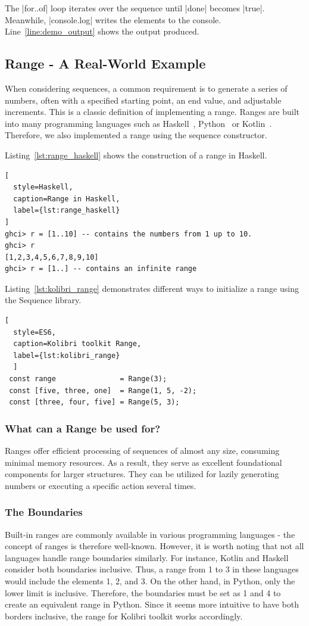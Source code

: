 The |for..of| loop iterates over the sequence until |done| becomes |true|.
Meanwhile, |console.log| writes the elements to the console.
Line~\ref{line:demo_output} shows the output produced.


\subsection{Range - A Real-World Example}
\label{sub:Range - A Real-World Example}
When considering sequences, a common requirement is to generate a series of
numbers, often with a specified starting point, an end value, and adjustable
increments. This is a classic definition of implementing a range.
Ranges are built into many programming languages such as
Haskell~\cite{haskell_list}, Python~\cite{python_range} or
Kotlin~\cite{kotlin_ranges}. Therefore, we also implemented a range using the
sequence constructor. 

Listing~\ref{lst:range_haskell} shows the construction of a range in Haskell.
\begin{lstlisting}[
  style=Haskell,
  caption=Range in Haskell,
  label={lst:range_haskell}
]
ghci> r = [1..10] -- contains the numbers from 1 up to 10.
ghci> r
[1,2,3,4,5,6,7,8,9,10]
ghci> r = [1..] -- contains an infinite range
\end{lstlisting}

Listing~\ref{lst:kolibri_range} demonstrates different ways to initialize a
range using the Sequence library.

\begin{lstlisting}[
  style=ES6, 
  caption=Kolibri toolkit Range,
  label={lst:kolibri_range}
  ]
 const range               = Range(3);
 const [five, three, one]  = Range(1, 5, -2);
 const [three, four, five] = Range(5, 3);
\end{lstlisting}

\subsubsection{What can a Range be used for?}
\label{subsub:What can a Range be used for?}
Ranges offer efficient processing of sequences of almost any size, consuming
minimal memory resources. As a result, they serve as excellent foundational
components for larger structures. They can be utilized for lazily generating
numbers or executing a specific action several times.

\subsubsection{The Boundaries}
\label{subsub:The Boundaries}
Built-in ranges are commonly available in various programming languages - the
concept of ranges is therefore well-known. However, it is worth noting that not
all languages handle range boundaries similarly. For instance, Kotlin and
Haskell consider both boundaries inclusive. Thus, a range from 1 to 3 in these
languages would include the elements 1, 2, and 3. On the other hand, in Python,
only the lower limit is inclusive. Therefore, the boundaries must be set as 1
and 4 to create an equivalent range in Python. Since it seems more intuitive to
have both borders inclusive, the range for Kolibri toolkit works accordingly.

